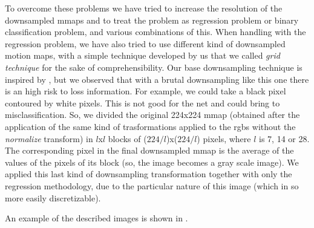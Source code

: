 \documentclass[10pt,twocolumn,hidelinks,letterpaper]{article}
\begin{document}
To overcome these problems we have tried to increase the resolution of the downsampled mmaps and to treat the problem as regression problem or binary classification problem, and various combinations of this. When handling with the regression problem, we have also tried to use different kind of downsampled motion maps, with a simple technique developed by us that we called \textit{grid technique} for the sake of comprehensibility. Our base downsampling technique is inspired by \cite{downsampling}, but we observed that with a brutal downsampling like this one there is an high risk to loss information. For example, we could take a black pixel contoured by white pixels. This is not good for the net and could bring to misclassification. So, we divided the original 224x224 mmap (obtained after the application of the same kind of trasformations applied to the rgbs without the \textit{normalize} transform) in $l$x$l$ blocks of ($224/l$)x($224/l$) pixels, where $l$ is 7, 14 or 28. The corresponding pixel in the final downsampled mmap is the average of the values of the pixels of its block (so, the image becomes a gray scale image). We applied this last kind of downsampling transformation together with only the regression methodology, due to the particular nature of this image (which in so more easily discretizable).

An example of the described images is shown in .
\end{document}
